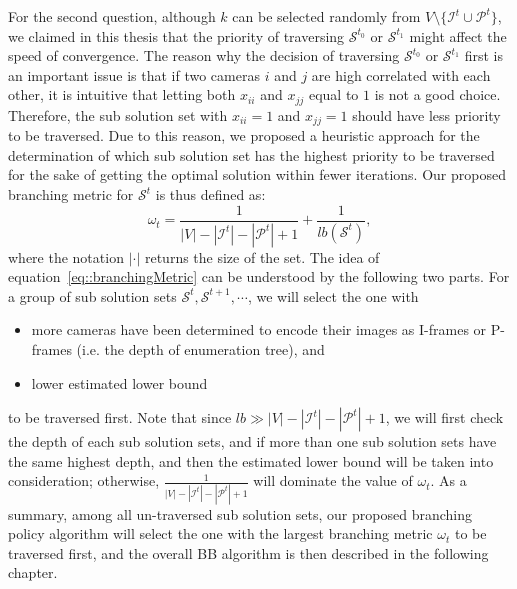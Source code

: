For the second question, although $k$ can be selected randomly from $ V \setminus \{\mathcal{I}^t \cup \mathcal{P}^t\}$, we claimed in this thesis that the priority of traversing $\mathcal{S}^{t_0}$ or $\mathcal{S}^{t_1}$ might affect the speed of convergence.
The reason why the decision of traversing $\mathcal{S}^{t_0}$ or $\mathcal{S}^{t_1}$ first is an important issue is that if two cameras $i$ and $j$ are high correlated with each other, it is intuitive that letting both $x_{ii}$ and $x_{jj}$ equal to $1$ is not a good choice.
%
Therefore, the sub solution set with $x_{ii}=1$ and $x_{jj}=1$ should have less priority to be traversed.
Due to this reason, we proposed a heuristic approach for the determination of which sub solution set has the highest priority to be traversed for the sake of getting the optimal solution within fewer iterations.
Our proposed branching metric for $\mathcal{S}^t$ is thus defined as:
\begin{equation}
\omega_t = \frac{1}{|V|-|\mathcal{I}^t|-|\mathcal{P}^t|+1}+\frac{1}{lb(\mathcal{S}^t)},
\label{eq::branchingMetric}
\end{equation}
where the notation $|\cdot|$ returns the size of the set.
The idea of equation~\eqref{eq::branchingMetric} can be understood by the following two parts.
For a group of sub solution sets $\mathcal{S}^t, \mathcal{S}^{t+1}, \cdots$, we will select the one with
\begin{itemize}
\item more cameras have been determined to encode their images as I-frames or P-frames (i.e. the depth of enumeration tree), and
\item  lower estimated lower bound
\end{itemize}
to be traversed first.
Note that since $lb \gg |V|-|\mathcal{I}^t|-|\mathcal{P}^t|+1$, we will first check the depth of each sub solution sets, and if more than one sub solution sets have the same highest depth, and then the estimated lower bound will be taken into consideration; otherwise, $\frac{1}{|V|-|\mathcal{I}^t|-|\mathcal{P}^t|+1}$ will dominate the value of $\omega_t$.
As a summary, among all un-traversed sub solution sets, our proposed branching policy algorithm will select the one with the largest branching metric $\omega_t$ to be traversed first, and the overall BB algorithm is then described in the following chapter.
%

